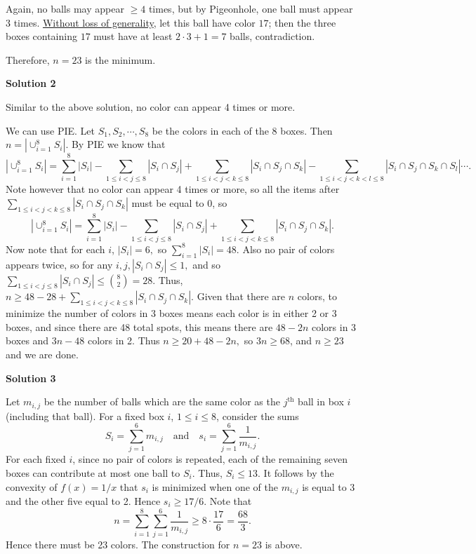 \begin{enumerate}
 Again, no balls may appear $\ge 4$ times, but by Pigeonhole, one ball must appear $3$ times. \href{https://artofproblemsolving.com/wiki/index.php?title=Without\_loss\_of\_generality}{Without loss of generality}, let this ball have color $17$; then the three boxes containing $17$ must have at least $2 \cdot 3 + 1 = 7$ balls, contradiction.

 Therefore, $n = 23$ is the minimum.

 



\textbf{Solution 2}

Similar to the above solution, no color can appear 4 times or more.

 We can use PIE. Let $S_1,S_2,\cdots ,S_8$ be the colors in each of the $8$ boxes. Then $n=|\cup_{i=1}^8S_i|$. By PIE we know that
 \[|\cup_{i=1}^8S_i|=\sum_{i=1}^8 |S_i|-\sum_{1\leq i<j\leq 8}|S_i\cap S_j|+\sum_{1\leq i<j<k\leq 8}|S_i\cap S_j\cap S_k|-\sum_{1\leq i<j<k<l\leq 8}|S_i\cap S_j\cap S_k\cap S_l|\cdots.\]Note however that no color can appear 4 times or more, so all the items after $\sum_{1\leq i<j<k\leq 8}|S_i\cap S_j\cap S_k|$ must be equal to 0, so
 \[|\cup_{i=1}^8S_i|=\sum_{i=1}^8 |S_i|-\sum_{1\leq i<j\leq 8}|S_i\cap S_j|+\sum_{1\leq i<j<k\leq 8}|S_i\cap S_j\cap S_k|.\]Now note that for each $i$, $|S_i|=6,$ so $\sum_{i=1}^8 |S_i|=48.$ Also no pair of colors appears twice, so for any $i,j, |S_i\cap S_j|\leq 1,$ and so $\sum_{1\leq i<j\leq 8}|S_i\cap S_j|\leq \binom82=28.$ Thus, $n\geq 48-28+\sum_{1\leq i<j<k\leq 8}|S_i\cap S_j\cap S_k|.$ Given that there are $n$ colors, to minimize the number of colors in 3 boxes means each color is in either 2 or 3 boxes, and since there are 48 total spots, this means there are $48-2n$ colors in 3 boxes and $3n-48$ colors in 2. Thus $n\geq 20+48-2n,$ so $3n\geq 68$, and $n\geq23$ and we are done.

 



\textbf{Solution 3}

Let $m_{i,j}$ be the number of balls which are the same color as the $j^{\text{th}}$ ball in box $i$ (including that ball). For a fixed box $i$, $1\leq i\leq 8$, consider the sums
 \[S_i = \sum_{j=1}^6 m_{i,j}\quad\text{and}\quad s_i = \sum_{j=1}^6 \frac{1}{m_{i,j}}.\]For each fixed $i$, since no pair of colors is repeated, each of the remaining seven boxes can contribute at most one ball to $S_i$. Thus, $S_i\leq 13$. It follows by the convexity of $f(x) = 1/x$ that $s_i$ is minimized when one of the $m_{i,j}$ is equal to 3 and the other five equal to 2. Hence $s_i\geq 17/6$. Note that
 \[n = \sum_{i=1}^8 \sum_{j=1}^6 \frac{1}{m_{i,j}}\geq 8\cdot\frac{17}{6} = \frac{68}{3}.\]Hence there must be 23 colors. The construction for $n = 23$ is above.


\end{enumerate}
